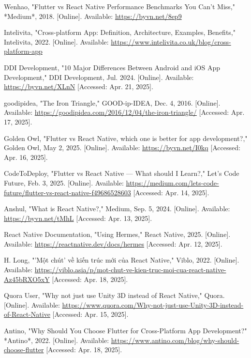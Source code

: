 \documentclass[12pt]{report}
\begin{document}
\begin{thebibliography}{1}
Wenhao, "Flutter vs React Native Performance Benchmarks You Can't Miss," *Medium*, 2018. [Online]. Available: \url{https://byvn.net/8ep9}


Intelivita, "Cross-platform App: Definition, Architecture, Examples, Benefits," Intelivita, 2022. [Online]. Available: \url{https://www.intelivita.co.uk/blog/cross-platform-app}

DDI Development, "10 Major Differences Between Android and iOS App Development," DDI Development, Jul. 2024. [Online]. Available: \url{https://byvn.net/XLnN} [Accessed: Apr. 21, 2025].

goodipidea, "The Iron Triangle," GOOD-ip-IDEA, Dec. 4, 2016. [Online]. Available: \url{https://goodipidea.com/2016/12/04/the-iron-triangle/} [Accessed: Apr. 17, 2025].

Golden Owl, "Flutter vs React Native, which one is better for app development?," Golden Owl, May 2, 2025. [Online]. Available: \url{https://byvn.net/I0kq} [Accessed: Apr. 16, 2025].

CodeToDeploy, "Flutter vs React Native — What should I Learn?," Let's Code Future, Feb. 3, 2025. [Online]. Available: \url{https://medium.com/lets-code-future/flutter-vs-react-native-f49686528603} [Accessed: Apr. 14, 2025].

Anshul, "What is React Native?," Medium, Sep. 5, 2024. [Online]. Available: \url{https://byvn.net/tMhL} [Accessed: Apr. 13, 2025].

React Native Documentation, "Using Hermes," React Native, 2025. [Online]. Available: \url{https://reactnative.dev/docs/hermes} [Accessed: Apr. 12, 2025].

H. Long, "'Một chút' về kiến trúc mới của React Native," Viblo, 2022. [Online]. Available: \url{https://viblo.asia/p/mot-chut-ve-kien-truc-moi-cua-react-native-Az45bRXO5xY} [Accessed: Apr. 18, 2025].

Quora User, "Why not just use Unity 3D instead of React Native," Quora. [Online]. Available: \url{https://www.quora.com/Why-not-just-use-Unity-3D-instead-of-React-Native} [Accessed: Apr. 15, 2025].

Antino, "Why Should You Choose Flutter for Cross-Platform App Development?" *Antino*, 2022. [Online]. Available: \url{https://www.antino.com/blog/why-should-choose-flutter} [Accessed: Apr. 18, 2025].



\end{thebibliography}
\end{document}
